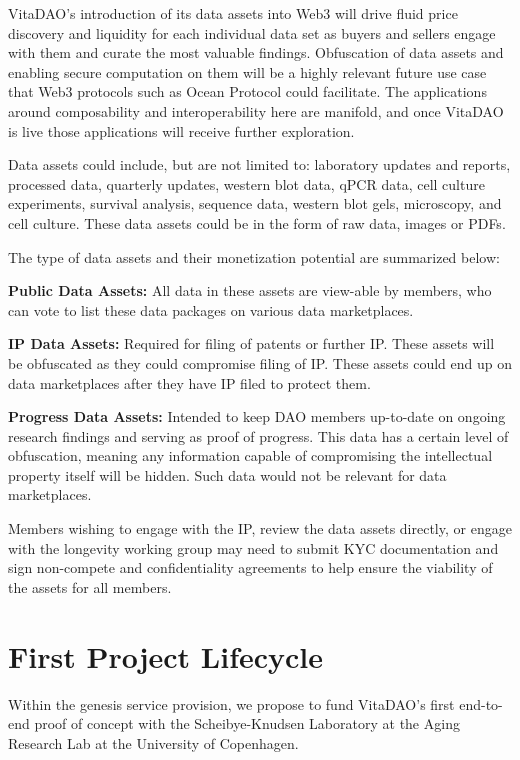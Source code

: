 \documentclass[10pt,letterpaper]{article}
\newenvironment{tight_enumerate}{
\begin{enumerate}
  \setlength{\itemsep}{0pt}
  \setlength{\parskip}{0pt}
}{\end{enumerate}}
\begin{document}
VitaDAO’s introduction of its data assets into Web3 will drive fluid price discovery and liquidity for each individual data set as buyers and sellers engage with them and curate the most valuable findings. Obfuscation of data assets and enabling secure computation on them will be a highly relevant future use case that Web3 protocols such as Ocean Protocol could facilitate. The applications around composability and interoperability here are manifold, and once VitaDAO is live those applications will receive further exploration. 

Data assets could include, but are not limited to: laboratory updates and reports, processed data, quarterly updates, western blot data, qPCR data, cell culture experiments, survival analysis, sequence data, western blot gels, microscopy, and cell culture. These data assets could be in the form of raw data, images or PDFs. 

The type of data assets and their monetization potential are summarized below:

\begin{tight_enumerate}
\item \textbf{Public Data Assets:} All data in these assets are view-able by members, who can vote to list these data packages on various data marketplaces.
\item \textbf{IP Data Assets:} Required for filing of patents or further IP. These assets will be obfuscated as they could compromise filing of IP. These assets could end up on data marketplaces after they have IP filed to protect them.
\item \textbf{Progress Data Assets:} Intended to keep DAO members up-to-date on ongoing research findings and serving as proof of progress. This data has a certain level of obfuscation, meaning any information capable of compromising the intellectual property itself will be hidden. Such data would not be relevant for data marketplaces.
\end{tight_enumerate}

Members wishing to engage with the IP, review the data assets directly, or engage with the longevity working group may need to submit KYC documentation and sign non-compete and confidentiality agreements to help ensure the viability of the assets for all members.

\section{First Project Lifecycle}
Within the genesis service provision, we propose to fund VitaDAO’s first end-to-end proof of concept with the Scheibye-Knudsen Laboratory at the Aging Research Lab at the University of Copenhagen.
\end{document}
